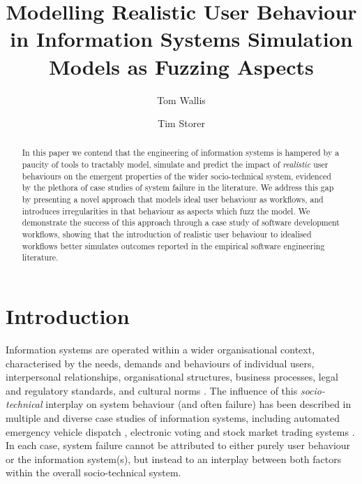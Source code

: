 \documentclass{llncs}
\title{Modelling Realistic User Behaviour in Information Systems Simulation Models as Fuzzing Aspects}
\author{Tom Wallis \and Tim Storer}  %
\institute{University of Glasgow, Glasgow, Scotland.\\
  \email{w.wallis.1@research.gla.ac.uk}\\
  \email{timothy.storer@glasgow.ac.uk}
}
\begin{document}

\maketitle


\begin{abstract}
  In this paper we contend that the engineering of information systems is hampered by a paucity of tools to tractably
  model, simulate and predict the impact of \emph{realistic} user behaviours on the emergent properties of the wider
  socio-technical system, evidenced by the plethora of case studies of system failure in the literature.  We address
  this gap by presenting a novel approach that models ideal user behaviour as workflows, and introduces irregularities
  in that behaviour as aspects which fuzz the model. We demonstrate the success of this approach through a case study of
  software development workflows, showing that the introduction of realistic user behaviour to idealised workflows
  better simulates outcomes reported in the empirical software engineering literature.
\end{abstract}


\section{Introduction}
\label{sec:introduction}


Information systems are operated within a wider organisational context, characterised by the needs, demands and
behaviours of individual users, interpersonal relationships, organisational structures, business processes, legal and
regulatory standards, and cultural norms \citep{bade07structures,pentland05organisational}.  The influence of this
\emph{socio-technical} interplay on system behaviour (and often failure) has been described in multiple and diverse case
studies of information systems, including automated emergency vehicle dispatch \citep{robinson96limited}, electronic
voting \citep{lock07observations} and stock market trading systems \citep{cftc-sec10findings}. In each case, system
failure cannot be attributed to either purely user behaviour or the information system(s), but instead to an interplay
between both factors within the overall socio-technical system.
\end{document}
